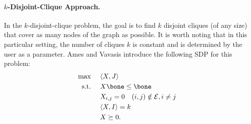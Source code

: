%
\paragraph{$k$-Disjoint-Clique Approach.} In the $k$-disjoint-clique problem,  the goal is to find $k$ disjoint cliques (of any size) that cover as many nodes of the graph as possible.  It is worth noting that in this particular setting, the number of cliques $k$ is constant and is determined by the user as a parameter. Ames and Vavasis  \cite{AV:14}  introduce the following SDP for this problem:
\begin{equation} \label{eq:av}
\begin{aligned}
\max ~~ & ~~ \langle X, J \rangle \\
\mathrm{s.t.} ~~ & ~~ X \bone \leq \bone \\
& ~~ X_{i,j} = 0 \quad (i,j) \notin \mathcal{E}, i \neq j \\
& ~~ \langle X, I \rangle = k \\
& ~~ X \succeq 0.
\end{aligned}
\end{equation}



